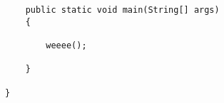 \documentclass[12pt]{article}
\begin{document}
\begin{enumerate}
\begin{enumerate}
\begin{verbatim}
    public static void main(String[] args)
    {

        weeee();

    }

}
\end{verbatim}











\end{enumerate}
\end{enumerate}
\end{document}

